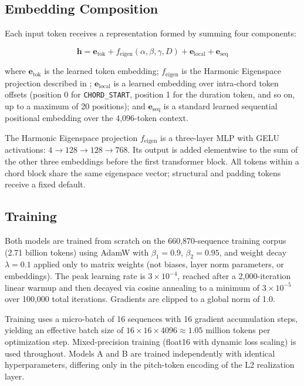 \documentclass{aimc2026}
\begin{document}
\subsection{Embedding Composition}

Each input token receives a representation formed by summing four components:

\begin{equation}
\mathbf{h} = \mathbf{e}_{\text{tok}} + f_{\text{eigen}}(\alpha, \beta, \gamma, D) + \mathbf{e}_{\text{local}} + \mathbf{e}_{\text{seq}}
\label{eq:embedding}
\end{equation}

\noindent where $\mathbf{e}_{\text{tok}}$ is the learned token embedding; $f_{\text{eigen}}$ is the Harmonic Eigenspace projection described in ; $\mathbf{e}_{\text{local}}$ is a learned embedding over intra-chord token offsets (position 0 for \texttt{CHORD\_START}, position 1 for the duration token, and so on, up to a maximum of 20 positions); and $\mathbf{e}_{\text{seq}}$ is a standard learned sequential positional embedding over the 4,096-token context.

The Harmonic Eigenspace projection $f_{\text{eigen}}$ is a three-layer MLP with GELU activations:
$4 \rightarrow 128 \rightarrow 128 \rightarrow 768$.
Its output is added elementwise to the sum of the other three embeddings before the first transformer block. All tokens within a chord block share the same eigenspace vector; structural and padding tokens receive a fixed default.

\subsection{Training}

Both models are trained from scratch on the 660,870-sequence training corpus (2.71 billion tokens) using AdamW \citep{loshchilov2019decoupled} with $\beta_1 = 0.9$, $\beta_2 = 0.95$, and weight decay $\lambda = 0.1$ applied only to matrix weights (not biases, layer norm parameters, or embeddings). The peak learning rate is $3 \times 10^{-4}$, reached after a 2,000-iteration linear warmup and then decayed via cosine annealing to a minimum of $3 \times 10^{-5}$ over 100,000 total iterations. Gradients are clipped to a global norm of 1.0.

Training uses a micro-batch of 16 sequences with 16 gradient accumulation steps, yielding an effective batch size of $16 \times 16 \times 4096 \approx 1.05$ million tokens per optimization step. Mixed-precision training (float16 with dynamic loss scaling) is used throughout. Models A and B are trained independently with identical hyperparameters, differing only in the pitch-token encoding of the L2 realization layer.
\end{document}
